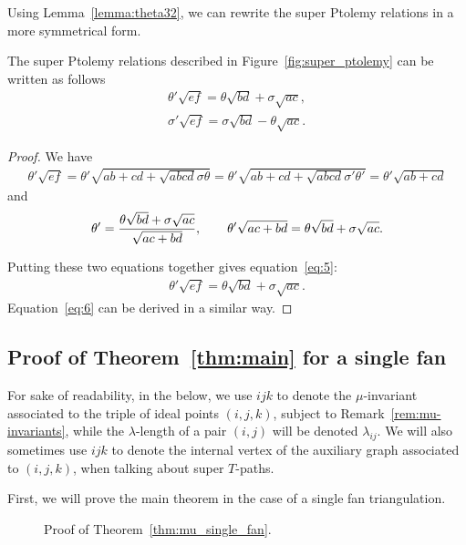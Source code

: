 Using Lemma~\ref{lemma:theta32}, we can rewrite the super Ptolemy relations in a more symmetrical form.
\begin{Proposition}
The super Ptolemy relations described in Figure~{\rm \ref{fig:super_ptolemy}} can be written as follows
\begin{gather}
\theta'\sqrt{ef} =	\theta\sqrt{bd}+\sigma \sqrt{ac},\label{eq:5}\\
\sigma'\sqrt{ef} =\sigma\sqrt{bd}-\theta\sqrt{ac}.\label{eq:6}
\end{gather}
\end{Proposition}
\begin{proof}We have
\begin{gather*}
\theta'\sqrt{ef} =\theta'\sqrt{ab+cd+\sqrt{abcd}\sigma\theta}
 =\theta'\sqrt{ab+cd+\sqrt{abcd}\sigma'\theta'}
 =\theta'\sqrt{ab+cd}
\end{gather*}
and
\begin{gather*}
	\theta' = {{ \theta\sqrt{bd}+\sigma \sqrt{ac}}\over{\sqrt{ac+bd}}},\qquad
	\theta'\sqrt{ac+bd} = \theta\sqrt{bd}+\sigma \sqrt{ac}.
\end{gather*}
	
Putting these two equations together gives equation~\eqref{eq:5}:
\begin{align*}
\theta'\sqrt{ef}= \theta\sqrt{bd}+\sigma \sqrt{ac}.
\end{align*}
Equation~\eqref{eq:6} can be derived in a similar way.
\end{proof}

\subsection{Proof of Theorem~\ref{thm:main} for a single fan}

For sake of readability, in the below, we use $\boxed{ijk}$ to denote the $\mu$-invariant associated to the triple of
ideal points $(i,j,k)$, subject to Remark~\ref{rem:mu-invariants}, while the $\lambda$-length of a pair $(i,j)$ will be
denoted $\lambda_{ij}$. We will also sometimes use $\boxed{ijk}$ to denote the internal vertex of the auxiliary graph associated to $(i,j,k)$, when talking about super $T$-paths.

First, we will prove the main theorem in the case of a single fan triangulation.

\begin{figure}[h] \centering
 
 \caption{Proof of Theorem~\ref{thm:mu_single_fan}.} \label{fig:mu_single_fan}
\end{figure}

